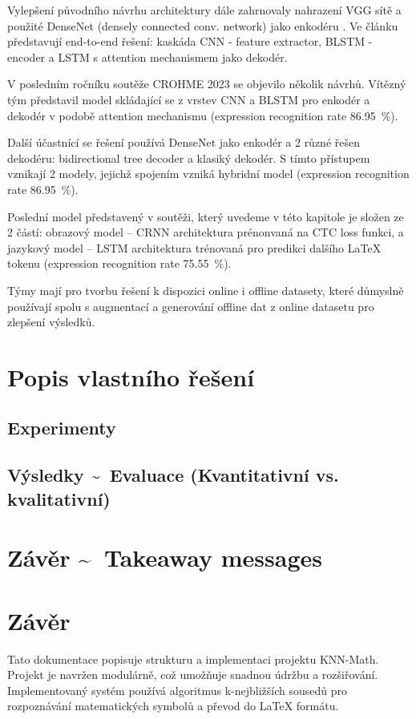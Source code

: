 Vylepšení původního návrhu architektury dále zahrnovaly nahrazení VGG sítě a použité DenseNet (densely connected conv. network) jako enkodéru \cite{ZHANG_2}. Ve článku \cite{LeAnhDuc} představují end-to-end řešení: kaskáda CNN - feature extractor, BLSTM - encoder a LSTM s attention mechanismem jako dekodér.

V posledním ročníku soutěže CROHME 2023 se objevilo několik návrhů. Vítězný tým představil model skládající se z vrstev CNN a BLSTM pro enkodér a dekodér v podobě attention mechanismu (expression recognition rate 86.95~\%).

Další účastnící se řešení používá DenseNet jako enkodér a 2 různé řešen dekodéru: bidirectional tree decoder a klasiký dekodér. S tímto přístupem vznikají 2 modely, jejichž spojením vzniká hybridní model (expression recognition rate 86.95~\%). 

Poslední model představený v soutěži, který uvedeme v této kapitole je složen ze 2 částí: obrazový model -- CRNN architektura prénonvaná na CTC loss funkci, a jazykový model -- LSTM architektura trénovaná pro predikci dalšího LaTeX tokenu (expression recognition rate 75.55~\%).

Týmy mají pro tvorbu řešení k dispozici online i offline datasety, které důmyslně používají spolu s augmentací a generování offline dat z online datasetu pro zlepšení výsledků.


\cite{CROHME_2023}



\section{Popis vlastního řešení}

\subsection{Experimenty}

\subsection{Výsledky \~~Evaluace (Kvantitativní vs. kvalitativní)}	

\section{Závěr \~~Takeaway messages}


\newpage
\section{Závěr}
Tato dokumentace popisuje strukturu a implementaci projektu KNN-Math. Projekt je navržen modulárně, což umožňuje snadnou údržbu a rozšiřování. Implementovaný systém používá algoritmus k-nejbližších sousedů pro rozpoznávání matematických symbolů a převod do LaTeX formátu.





